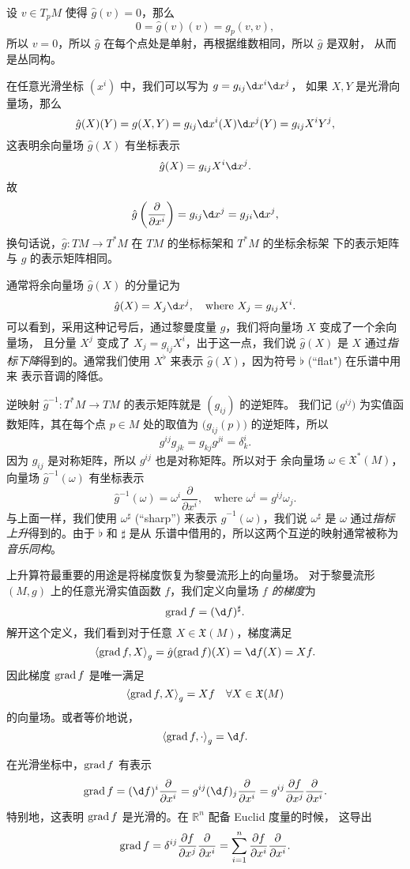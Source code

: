 设 $v\in T_pM$ 使得 $\hat g(v)=0$，那么
\[
  0=\hat g(v)(v)=g_p(v,v),
\]
所以 $v=0$，所以 $\hat g$ 在每个点处是单射，再根据维数相同，所以 $\hat g$ 是双射，
从而是丛同构。

在任意光滑坐标 $(x^i)$ 中，我们可以写为 $g=g_{ij}\d x^i\d x^j$，
如果 $X,Y$ 是光滑向量场，那么
\[
  \hat g(X)(Y)=g(X,Y)=g_{ij}\d x^i(X)\d x^j(Y)=
  g_{ij}X^iY^j,  
\]
这表明余向量场 $\hat g(X)$ 有坐标表示
\[
  \hat g(X)=g_{ij}X^i\d x^j.  
\]
故
\[
  \hat g\left(\frac{\partial}{\partial x^i}\right)=
  g_{ij} \d x^j=g_{ji}\d x^j,  
\]
换句话说，$\hat g:TM\to T^*M$ 在 $TM$ 的坐标标架和 $T^*M$ 的坐标余标架
下的表示矩阵与 $g$ 的表示矩阵相同。

通常将余向量场 $\hat g(X)$ 的分量记为
\[
  \hat g(X)=X_j\d x^j,\quad \text{where $X_j=g_{ij}X^i$}.  
\]
可以看到，采用这种记号后，通过黎曼度量 $g$，我们将向量场 $X$ 变成了一个余向量场，
且分量 $X^j$ 变成了 $X_j=g_{ij}X^i$，出于这一点，我们说
$\hat g(X)$ 是 $X$ 通过\emph{指标下降}得到的。通常我们使用 
$X^\flat$ 来表示 $\hat g(X)$，因为符号 $\flat$ (``flat") 在乐谱中用来
表示音调的降低。

逆映射 $\hat g^{-1}:T^*M\to TM$ 的表示矩阵就是 $(g_{ij})$ 的逆矩阵。
我们记 $\bigl(g^{ij}\bigr)$ 为实值函数矩阵，其在每个点 $p\in M$
处的取值为 $\bigl(g_{ij}(p)\bigr)$ 的逆矩阵，所以
\[
  g^{ij}g_{jk}=g_{kj}g^{ji}=\delta_k^i.  
\]
因为 $g_{ij}$ 是对称矩阵，所以 $g^{ij}$ 也是对称矩阵。所以对于
余向量场 $\omega\in \mathfrak{X}^*(M)$，向量场 $\hat g^{-1}(\omega)$
有坐标表示
\[
  \hat g^{-1}(\omega)=\omega^i\frac{\partial}{\partial x^i},
  \quad \text{where $\omega^i=g^{ij}\omega_j$}  .
\]
与上面一样，我们使用 $\omega^{\sharp}$ (``sharp'') 来表示
$\hat g^{-1}(\omega)$，我们说 $\omega^\sharp$ 是 $\omega$
通过\emph{指标上升}得到的。由于 $\flat$ 和 $\sharp$ 是从
乐谱中借用的，所以这两个互逆的映射通常被称为\emph{音乐同构}。

上升算符最重要的用途是将梯度恢复为黎曼流形上的向量场。
对于黎曼流形 $(M,g)$ 上的任意光滑实值函数 $f$，我们定义向量场
\emph{$f$ 的梯度}为
\[
  \grad f=(\d f)^\sharp.
\]
解开这个定义，我们看到对于任意 $X\in \mathfrak{X}(M)$，梯度满足
\[
  \inn{\grad f,X}_g=\hat g(\grad f)(X)=
  \d f(X)=Xf.
\]
因此梯度 $\operatorname{grad} f$ 是唯一满足
\[
  \left\langle \operatorname{grad} f,X\right\rangle_g=Xf\quad \forall X\in \mathfrak{X}(M)  
\]
的向量场。或者等价地说，
\[
  \inn{\grad f,\cdot}_g=\d f.  
\]

在光滑坐标中，$\operatorname{grad} f$ 有表示
\[
  \grad f=(\d f)^i\frac{\partial}{\partial x^i}
  =g^{ij}(\d f)_j  \frac{\partial}{\partial x^i}
  =g^{ij}\frac{\partial f}{\partial x^j}\frac{\partial}{\partial x^i}.
\]
特别地，这表明 $\operatorname{grad} f$ 是光滑的。在 $\mathbb{R}^n$ 配备 Euclid 度量的时候，
这导出
\[
  \operatorname{grad} f=\delta^{ij}\frac{\partial f}{\partial x^j}\frac{\partial}{\partial x^i}
  =\sum_{i=1}^n\frac{\partial f}{\partial x^i}\frac{\partial}{\partial x^i}.
\]

